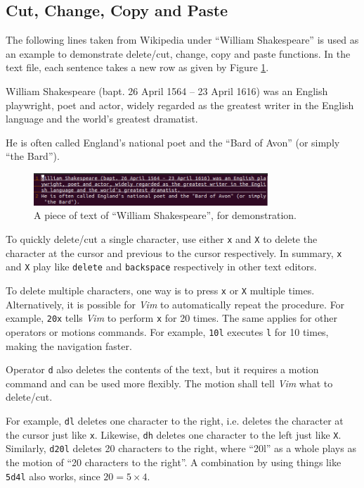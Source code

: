 \subsection{Cut, Change, Copy and Paste}

The following lines taken from Wikipedia under ``William Shakespeare'' is used as an example to demonstrate delete/cut, change, copy and paste functions. In the text file, each sentence takes a new row as given by Figure \ref{ch3fig:vimdemo1}.

\begin{shortbox}
William Shakespeare (bapt. 26 April 1564 – 23 April 1616) was an English playwright, poet and actor, widely regarded as the greatest writer in the English language and the world's greatest dramatist.

He is often called England's national poet and the ``Bard of Avon'' (or simply ``the Bard'').
\end{shortbox}

\begin{figure}
\centering
\includegraphics[width=250pt]{chapters/chapter3/figures/vimdemo1.png}
\caption{A piece of text of ``William Shakespeare'', for demonstration.} \label{ch3fig:vimdemo1}
\end{figure}

To quickly delete/cut a single character, use either \verb|x| and \verb|X| to delete the character at the cursor and previous to the cursor respectively. In summary, \verb|x| and \verb|X| play like \verb|delete| and \verb|backspace| respectively in other text editors.

To delete multiple characters, one way is to press \verb|x| or \verb|X| multiple times. Alternatively, it is possible for \textit{Vim} to automatically repeat the procedure. For example, \verb|20x| tells \textit{Vim} to perform \verb|x| for 20 times. The same applies for other operators or motions commands. For example, \verb|10l| executes \verb|l| for 10 times, making the navigation faster.

Operator \verb|d| also deletes the contents of the text, but it requires a motion command and can be used more flexibly. The motion shall tell \textit{Vim} what to delete/cut.

For example, \verb|dl| deletes one character to the right, i.e. deletes the character at the cursor just like \verb|x|. Likewise, \verb|dh| deletes one character to the left just like \verb|X|. Similarly, \verb|d20l| deletes 20 characters to the right, where ``20l'' as a whole plays as the motion of ``20 characters to the right''. A combination by using things like \verb|5d4l| also works, since $20=5\times 4$.

